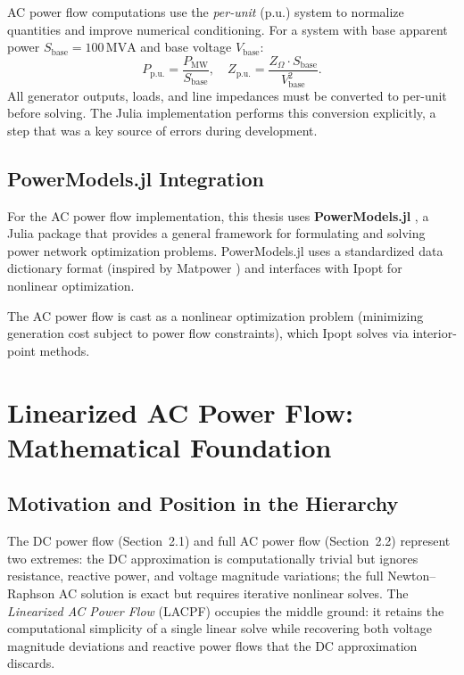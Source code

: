 AC power flow computations use the \emph{per-unit} (p.u.) system to normalize quantities and improve numerical conditioning. For a system with base apparent power $S_\text{base} = 100\,\text{MVA}$ and base voltage $V_\text{base}$:
\begin{equation}
    P_\text{p.u.} = \frac{P_\text{MW}}{S_\text{base}}, \quad
    Z_\text{p.u.} = \frac{Z_\Omega \cdot S_\text{base}}{V_\text{base}^2}.
\end{equation}
All generator outputs, loads, and line impedances must be converted to per-unit before solving. The Julia implementation performs this conversion explicitly, a step that was a key source of errors during development.

\subsection{PowerModels.jl Integration}

For the AC power flow implementation, this thesis uses \textbf{PowerModels.jl} \cite{coffrin2018powermodels}, a Julia package that provides a general framework for formulating and solving power network optimization problems. PowerModels.jl uses a standardized data dictionary format (inspired by Matpower \cite{zimmerman2011matpower}) and interfaces with Ipopt \cite{wachter2006ipopt} for nonlinear optimization.

The AC power flow is cast as a nonlinear optimization problem (minimizing generation cost subject to power flow constraints), which Ipopt solves via interior-point methods.

\section{Linearized AC Power Flow: Mathematical Foundation}

\subsection{Motivation and Position in the Hierarchy}

The DC power flow (Section~2.1) and full AC power flow (Section~2.2) represent two extremes: the DC approximation is computationally trivial but ignores resistance, reactive power, and voltage magnitude variations; the full Newton--Raphson AC solution is exact but requires iterative nonlinear solves. The \emph{Linearized AC Power Flow} (LACPF) occupies the middle ground: it retains the computational simplicity of a single linear solve while recovering both voltage magnitude deviations and reactive power flows that the DC approximation discards.

